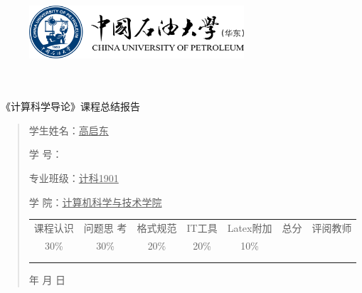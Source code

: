 \documentclass{article}
\renewcommand{\today}{\number\year 年 \number\month 月 \number\day 日}
\begin{document}
\begin{figure}
    \centering
    \includegraphics[width=8cm]{upc.png}

    \label{figupc}
\end{figure}

	\begin{center}
		\quad \\
		\quad \\
		\heiti \fontsize{45}{17} \quad \quad \quad 
		\vskip 1.5cm
		\heiti {} 《计算科学导论》课程总结报告
	\end{center}
	\vskip 2.0cm
		
	\begin{quotation}
		\doublespacing
		
        \par\setlength\parindent{7em}
		\quad 

		学生姓名：\underline{\qquad  高启东 \qquad \qquad}

		学\hspace{0.8cm} 号：\underline{\qquad}
		
		专业班级：\underline{\qquad 计科1901 \qquad  }
		
        学\hspace{0.8cm} 院：\underline{计算机科学与技术学院}
		\vskip 2cm
		\centering
		\begin{table}[h]
            \centering 
            \begin{tabular}{|c|c|c|c|c|c|c|}
                \hline
                课程认识 & 问题思 考 & 格式规范  & IT工具  & Latex附加  & 总分 & 评阅教师 \\
                30\% & 30\% & 20\% & 20\% & 10\% &  &  \\
                \hline
                 & & & & & &\\
                & & & & & &\\
                \hline
            \end{tabular}
        \end{table}
		\vskip 2cm
		\today
	\end{quotation}
\end{document}
